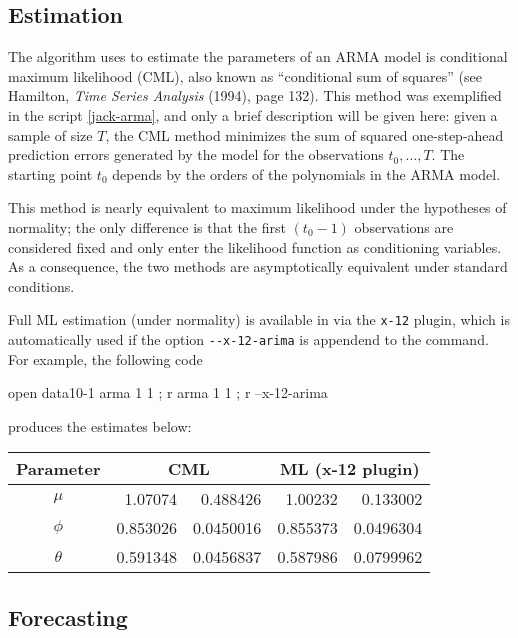 \subsection{Estimation}
\label{arma-est}

The algorithm  uses to estimate the parameters of an ARMA
model is conditional maximum likelihood (CML), also known as
``conditional sum of squares'' (see Hamilton, \emph{Time Series
  Analysis} (1994), page 132). This method was exemplified in the
script \ref{jack-arma}, and only a brief description will be given
here: given a sample of size $T$, the CML method minimizes the sum of
squared one-step-ahead prediction errors generated by the model for
the observations $t_0, \ldots, T$. The starting point $t_0$ depends by
the orders of the polynomials in the ARMA model.

This method is nearly equivalent to maximum likelihood under the
hypotheses of normality; the only difference is that the first $(t_0 -
1)$ observations are considered fixed and only enter the likelihood
function as conditioning variables. As a consequence, the two methods
are asymptotically equivalent under standard conditions.

Full ML estimation (under normality) is available in  via
the \verb|x-12| plugin, which is automatically used if the option
\verb|--x-12-arima| is appendend to the  command. For
example, the following code
\begin{code}
  open data10-1
  arma 1 1 ; r
  arma 1 1 ; r --x-12-arima
\end{code}
produces the estimates below:
\begin{center}
  \begin{tabular}{crrrr}
    \hline
    Parameter & \multicolumn{2}{c}{\textrm{CML}} &
    \multicolumn{2}{c}{\textrm{ML (x-12 plugin)}} \\
    \hline 
    $\mu$ & 1.07074 & 0.488426 &  1.00232 & 0.133002 \\
    $\phi$ & 0.853026 & 0.0450016 & 0.855373  & 0.0496304 \\
    $\theta$ & 0.591348 & 0.0456837 & 0.587986 & 0.0799962 \\
    \hline
  \end{tabular}
\end{center}

\subsection{Forecasting}
\label{arma-fcast}


